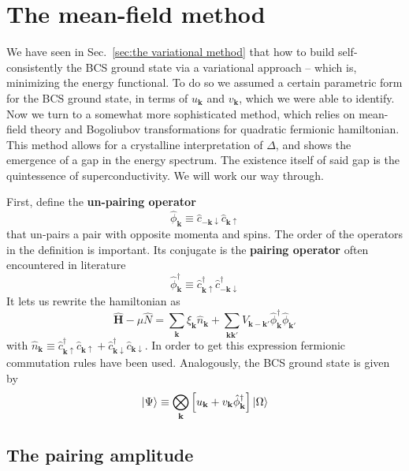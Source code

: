 \section{The mean-field method}\label{sec:the mean-field method}

We have seen in Sec.~\ref{sec:the variational method} that how to build self-consistently the BCS ground state via a variational approach -- which is, minimizing the energy functional. To do so we assumed a certain parametric form for the BCS ground state, in terms of $u_\mathbf{k}$ and $v_\mathbf{k}$, which we were able to identify. Now we turn to a somewhat more sophisticated method, which relies on mean-field theory and Bogoliubov transformations for quadratic fermionic hamiltonian. This method allows for a crystalline interpretation of $\Delta$, and shows the emergence of a gap in the energy spectrum. The existence itself of said gap is the quintessence of superconductivity. We will work our way through. 

First, define the \textbf{un-pairing operator}
\[
	\hat{\phi}_\mathbf{k} \equiv \hat{c}_{-\mathbf{k}\downarrow} \hat{c}_{\mathbf{k}\uparrow}
\]
that un-pairs a pair with opposite momenta and spins. The order of the operators in the definition is important. Its conjugate is the \textbf{pairing operator} often encountered in literature
\[
	\hat{\phi}_\mathbf{k}^\dagger \equiv  \hat{c}_{\mathbf{k}\uparrow}^\dagger \hat{c}_{-\mathbf{k}\downarrow}^\dagger
\]
It lets us rewrite the hamiltonian as
\[
	\hat{\bm H} - \mu\hat{N} = \sum_{\mathbf{k}} \xi_{\mathbf{k}} \hat n_\mathbf{k} + \sum_{\mathbf{k}\mathbf{k}'} V_{\mathbf{k}-\mathbf{k}'} \hat{\phi}_\mathbf{k}^\dagger \hat{\phi}_{\mathbf{k}'}
\]
with $\hat{n}_\mathbf{k} \equiv \hat{c}_{\mathbf{k}\uparrow}^\dagger \hat{c}_{\mathbf{k}\uparrow} + \hat{c}_{\mathbf{k}\downarrow}^\dagger \hat{c}_{\mathbf{k}\downarrow}$. In order to get this expression fermionic commutation rules have been used. Analogously, the BCS ground state is given by
\begin{equation}\label{eq:bcs ground state pairing operator form}
	\ket{\Psi} \equiv \bigotimes_\mathbf{k} \left[{u_\mathbf{k} + v_\mathbf{k} \hat{\phi}_\mathbf{k}^\dagger}\right] \ket{\Omega}
\end{equation}

\subsection{The pairing amplitude}\label{subsec:the pairing amplitude}

